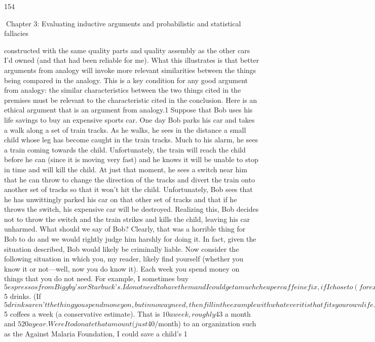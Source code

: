 154

Chapter 3: Evaluating inductive arguments and probabilistic and statistical fallacies

constructed with the same quality parts and quality assembly as the other cars
I’d owned (and that had been reliable for me). What this illustrates is that better
arguments from analogy will invoke more relevant similarities between the
things being compared in the analogy. This is a key condition for any good
argument from analogy: the similar characteristics between the two things cited
in the premises must be relevant to the characteristic cited in the conclusion.
Here is an ethical argument that is an argument from analogy.1 Suppose that
Bob uses his life savings to buy an expensive sports car. One day Bob parks his
car and takes a walk along a set of train tracks. As he walks, he sees in the
distance a small child whose leg has become caught in the train tracks. Much to
his alarm, he sees a train coming towards the child. Unfortunately, the train will
reach the child before he can (since it is moving very fast) and he knows it will be
unable to stop in time and will kill the child. At just that moment, he sees a
switch near him that he can throw to change the direction of the tracks and
divert the train onto another set of tracks so that it won’t hit the child.
Unfortunately, Bob sees that he has unwittingly parked his car on that other set
of tracks and that if he throws the switch, his expensive car will be destroyed.
Realizing this, Bob decides not to throw the switch and the train strikes and kills
the child, leaving his car unharmed. What should we say of Bob? Clearly, that
was a horrible thing for Bob to do and we would rightly judge him harshly for
doing it. In fact, given the situation described, Bob would likely be criminally
liable. Now consider the following situation in which you, my reader, likely find
yourself (whether you know it or not—well, now you do know it). Each week you
spend money on things that you do not need. For example, I sometimes buy $5
espressos from Biggby’s or Starbuck’s. I do not need to have them and I could
get a much cheaper caffeine fix, if I chose to (for example, I could make a strong
cup of coffee at my office and put sweetened hazelnut creamer in it). In any
case, I really don’t need the caffeine at all! And yet I regularly purchase these $5
drinks. (If $5 drinks aren’t the thing you spend money on, but in no way need,
then fill in the example with whatever it is that fits your own life.) With the
money that you could save from forgoing these luxuries, you could, quite
literally, save a child’s life. Suppose (to use myself as an example) I were to buy
two $5 coffees a week (a conservative estimate). That is $10 a week, roughly
$43 a month and $520 a year. Were I to donate that amount (just $40/month) to
an organization such as the Against Malaria Foundation, I could save a child’s
1

